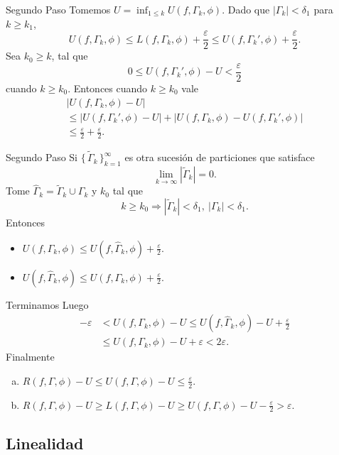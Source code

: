 \documentclass[utf8]{beamer}
\theoremstyle{plain}
\theoremstyle{definition}
\theoremstyle{remark}
\numberwithin{equation}{section}
\newcommand{\dl}{\delta}                %
\newcommand{\eps}{\varepsilon}          %
\newcommand{\Ga}{\Gamma}                %
\newcommand{\set}[1]{\{\,#1\,\}}    %
\renewcommand{\geq}{\geqslant}          %
\renewcommand{\leq}{\leqslant}          %
\newcommand{\To}{\Rightarrow}
\newcommand{\suck}{_{k=1}^\infty} %
\renewcommand{\.}{\Cdot}                %
\begin{document}
\begin{frame}{Segundo Paso}
    Tomemos $U=\inf_{1\leq k}U(f,\Ga_k,\phi)$. Dado que $|\Ga_k|<\dl_1$ para $k\geq k_1$, 
    $$U(f,\Ga_k,\phi)\leq L(f,\Ga_k,\phi)+\frac\eps2\leq U(f,\Ga_k',\phi)+\frac{\eps}{2}.$$
  Sea $k_0\geq k$, tal que 
  $$0\leq U(f,\Ga_k',\phi)-U<\frac\eps2$$
  cuando $k\geq k_0$. Entonces cuando $k\geq k_0$ vale
  \begin{gather*}
    |U(f,\Ga_k,\phi)-U|\\
    \leq |U(f,\Ga_k',\phi)-U|+|U(f,\Ga_k,\phi)-U(f,\Ga_k',\phi)|\\
    \leq \frac{\eps}{2}+\frac{\eps}{2}.
  \end{gather*}
     \end{frame}

\begin{frame}{Segundo Paso}
  Si $\set{\tilde\Ga_k}\suck$ es otra sucesión de particiones que satisface
  $$\lim_{k\to\infty}|\tilde{\Ga}_k|=0.$$
  Tome $\hat\Ga_k=\tilde\Ga_k\cup\Ga_k$ y $k_0$ tal que 
  $$k\geq k_0\To |\tilde\Ga_k|<\dl_1,\ |\Ga_k|<\dl_1.$$
  Entonces 
  \begin{itemize}
    \item $U(f,\Ga_k,\phi)\leq U(f,\hat\Ga_k,\phi)+\frac\eps2$.
    \item $U(f,\hat\Ga_k,\phi)\leq U(f,\Ga_k,\phi) +\frac\eps2$.
  \end{itemize}
\end{frame}

\begin{frame}{Terminamos}
  Luego 
  \begin{align*}
    -\eps&<U(f,\Ga_k,\phi)-U\leq U(f,\hat\Ga_k,\phi)-U+\frac\eps2\\
    &\leq U(f,\Ga_k,\phi)-U+\eps<2\eps.
  \end{align*}
  Finalmente 
  \begin{enumerate}[a)]
    \item $R(f,\Ga,\phi)-U\leq U(f,\Ga,\phi)-U\leq \frac\eps2$.
    \item $R(f,\Ga,\phi)-U\geq L(f,\Ga,\phi)-U\geq U(f,\Ga,\phi)-U-\frac\eps2>\eps$.
  \end{enumerate}
\end{frame}

\subsection{Linealidad}
\end{document}
